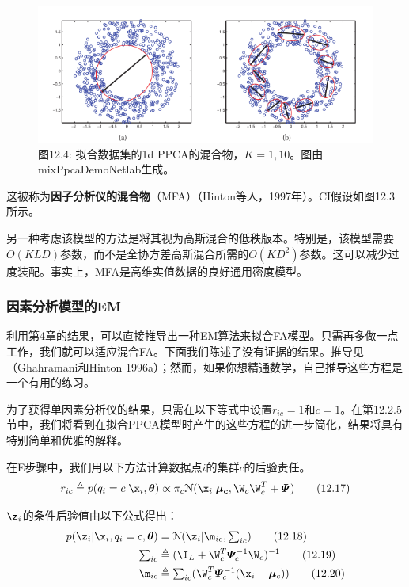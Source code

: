 \documentclass[a4paper]{article}
\begin{document}
\begin{figure}[h]
	\centering
	\includegraphics[width=1\linewidth]{fig/figure4}
	\caption*{图12.4: 拟合数据集的1d PPCA的混合物，$K = 1, 10$。图由mixPpcaDemoNetlab生成。 }
\end{figure}

这被称为\textbf{因子分析仪的混合物}（MFA）（Hinton等人，1997年）。CI假设如图12.3所示。

另一种考虑该模型的方法是将其视为高斯混合的低秩版本。特别是，该模型需要$O(KLD)$参数，而不是全协方差高斯混合所需的$O(KD^2)$参数。这可以减少过度装配。事实上，MFA是高维实值数据的良好通用密度模型。 
\subsubsection{因素分析模型的EM}
利用第4章的结果，可以直接推导出一种EM算法来拟合FA模型。只需再多做一点工作，我们就可以适应混合FA。下面我们陈述了没有证据的结果。推导见（Ghahramani和Hinton 1996a）；然而，如果你想精通数学，自己推导这些方程是一个有用的练习。

为了获得单因素分析仪的结果，只需在以下等式中设置$r_{ic}=1$和$c=1$。在第12.2.5节中，我们将看到在拟合PPCA模型时产生的这些方程的进一步简化，结果将具有特别简单和优雅的解释。 

在E步骤中，我们用以下方法计算数据点$i$的集群$c$的后验责任。
\begin{equation}
	r_{ic}\triangleq p(q_i=c\vert\x_i,\boldsymbol{\theta}) \propto \pi_c\mathcal{N}(\x_i\vert\boldsymbol{\mu_c},\W_c\W_c^T+\boldsymbol{\varPsi})\tag{12.17}
\end{equation}

$\z_i$的条件后验值由以下公式得出：
\begin{align}
	p(\z_i\vert\x_i,q_i=c,\boldsymbol{\theta})  &=  \mathcal{N}(\z_i\vert\m_{ic},\textstyle\sum\nolimits_{ic})\tag{12.18}\\
	\textstyle\sum\nolimits_{ic}  &\triangleq  (\I_L+\W_c^T\boldsymbol{\varPsi}_c^{-1}\W_c)^{-1}\tag{12.19}\\
	\m_{ic}  &\triangleq  \textstyle\sum\nolimits_{ic}(\W_c^T\boldsymbol{\varPsi}_c^{-1}(\x_i-\boldsymbol{\mu}_c))\tag{12.20}
\end{align}
\end{document}
